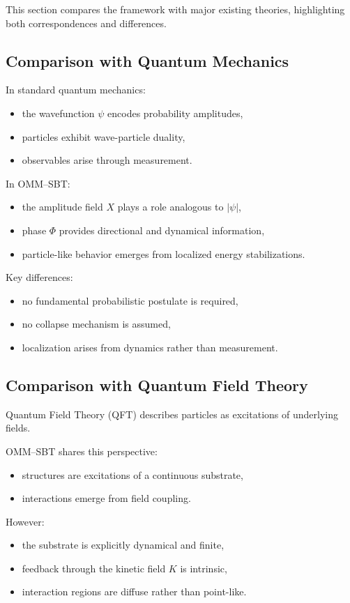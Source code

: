 \documentclass[11pt]{article}
\begin{document}
This section compares the framework with major existing theories, highlighting both correspondences and differences.

\subsection{Comparison with Quantum Mechanics}

In standard quantum mechanics:
\begin{itemize}
\item the wavefunction $\psi$ encodes probability amplitudes,
\item particles exhibit wave-particle duality,
\item observables arise through measurement.
\end{itemize}

In OMM--SBT:
\begin{itemize}
\item the amplitude field $X$ plays a role analogous to $|\psi|$,
\item phase $\Phi$ provides directional and dynamical information,
\item particle-like behavior emerges from localized energy stabilizations.
\end{itemize}

Key differences:
\begin{itemize}
\item no fundamental probabilistic postulate is required,
\item no collapse mechanism is assumed,
\item localization arises from dynamics rather than measurement.
\end{itemize}

\subsection{Comparison with Quantum Field Theory}

Quantum Field Theory (QFT) describes particles as excitations of underlying fields.

OMM--SBT shares this perspective:
\begin{itemize}
\item structures are excitations of a continuous substrate,
\item interactions emerge from field coupling.
\end{itemize}

However:
\begin{itemize}
\item the substrate is explicitly dynamical and finite,
\item feedback through the kinetic field $K$ is intrinsic,
\item interaction regions are diffuse rather than point-like.
\end{itemize}
\end{document}
